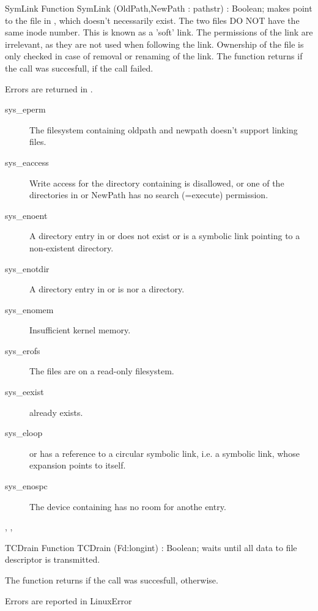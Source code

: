 
\begin{function}{SymLink}
\Declaration
Function SymLink (OldPath,NewPath : pathstr) : Boolean;
\Description
{} makes  point to the file in , which doesn't
necessarily exist. The two files DO NOT have the same inode number.
This is known as a 'soft' link.
The permissions of the link are irrelevant, as they are not used when
following the link. Ownership of the file is only checked in case of removal
or renaming of the link.
The function returns  if the call was succesfull,  if the call
failed.

\Errors
 Errors are returned in .
\begin{description}
\item[sys\_eperm] The filesystem containing oldpath and newpath doesn't
support linking files.
\item[sys\_eaccess] Write access for the directory containing 
is disallowed, or one of the directories in  or {NewPath} has no
search (=execute) permission.
\item[sys\_enoent] A directory entry in  or  does
not exist or is a symbolic link pointing to a non-existent directory.
\item[sys\_enotdir] A directory entry in  or  is
nor a directory.
\item[sys\_enomem] Insufficient kernel memory.
\item[sys\_erofs] The files are on a read-only filesystem.
\item[sys\_eexist]  already exists.
\item[sys\_eloop]  or  has a reference to a circular
symbolic link, i.e. a symbolic link, whose expansion points to itself.
\item[sys\_enospc] The device containing  has no room for anothe
entry.
\end{description}

\SeeAlso
{}, ,  
\end{function}


\begin{function}{TCDrain}
\Declaration
Function TCDrain (Fd:longint) : Boolean;
\Description
  waits until all data to file descriptor  is transmitted.
  
  The function returns  if the call was succesfull, 
  otherwise.

\Errors
Errors are reported in LinuxError
\SeeAlso
{}
\end{function}

